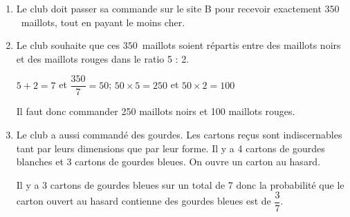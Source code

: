 \begin{enumerate}
\begin{enumerate}
	\end{enumerate}
	
\item %

Le club doit passer sa commande sur le site B pour recevoir exactement $350$~maillots, tout en payant le moins cher.

\item Le club souhaite que ces $350$~maillots soient répartis entre des maillots noirs et des maillots rouges dans le ratio 5 : 2.

$5+2=7$ et $\dfrac{350}{7}=50$; $50\times 5=250$ et $50\times 2=100$

Il faut donc commander 250 maillots noirs et 100 maillots rouges.

\item Le club a aussi commandé des gourdes. Les cartons reçus sont indiscernables tant par leurs dimensions que par leur forme. 
Il y a 4 cartons de gourdes blanches et 3 cartons de gourdes bleues.
On ouvre un carton au hasard. 

Il y a 3 cartons de gourdes bleues sur un total de 7 donc la probabilité que le carton ouvert au hasard contienne des gourdes bleues est de $\dfrac{3}{7}$.
\end{enumerate}


